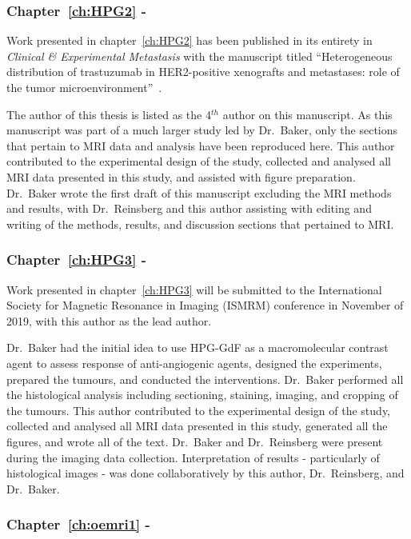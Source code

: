 \subsubsection{Chapter~\ref{ch:HPG2} - }

Work presented in chapter~\ref{ch:HPG2} has been published in its entirety in \emph{Clinical \& Experimental Metastasis} with the manuscript titled ``Heterogeneous distribution of trastuzumab in HER2-positive xenografts and metastases: role of the tumor microenvironment''~\cite{Baker:2018ex}.

The author of this thesis is listed as the 4$^{th}$ author on this manuscript.
As this manuscript was part of a much larger study led by Dr.\ Baker, only the sections that pertain to MRI data and analysis have been reproduced here.
This author contributed to the experimental design of the study, collected and analysed all MRI data presented in this study, and assisted with figure preparation.
Dr.\ Baker wrote the first draft of this manuscript excluding the MRI methods and results, with Dr.\ Reinsberg and this author assisting with editing and writing of the methods, results, and discussion sections that pertained to MRI.

\subsubsection{Chapter~\ref{ch:HPG3} - }

Work presented in chapter~\ref{ch:HPG3} will be submitted to the International Society for Magnetic Resonance in Imaging (ISMRM) conference in November of 2019, with this author as the lead author.

Dr.\ Baker had the initial idea to use \acs{HPG-GdF} as a macromolecular contrast agent to assess response of anti-angiogenic agents, designed the experiments, prepared the tumours, and conducted the interventions.
Dr.\ Baker performed all the histological analysis including sectioning, staining, imaging, and cropping of the tumours.
This author contributed to the experimental design of the study, collected and analysed all MRI data presented in this study, generated all the figures, and wrote all of the text. 
Dr.\ Baker and Dr.\ Reinsberg were present during the imaging data collection.
Interpretation of results - particularly of histological images - was done collaboratively by this author, Dr.\ Reinsberg, and Dr.\ Baker.

\subsubsection{Chapter~\ref{ch:oemri1} - }

